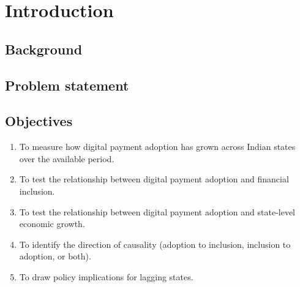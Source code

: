 \chapter{Introduction}

\section{Background}

\section{Problem statement}

\section{Objectives}
\begin{enumerate}
\item To measure how digital payment adoption has grown across Indian states over the available period.
\item To test the relationship between digital payment adoption and financial inclusion.
\item To test the relationship between digital payment adoption and state-level economic growth.
\item To identify the direction of causality (adoption to inclusion, inclusion to adoption, or both).
\item To draw policy implications for lagging states.
\end{enumerate}

